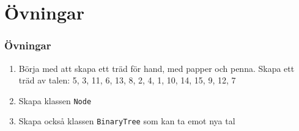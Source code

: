\documentclass[aspectratio=169]{beamer}
\begin{document}
\section{Övningar}

\begin{frame}
	\frametitle{Övningar}
	
	\begin{enumerate}
		\item Börja med att skapa ett träd för hand, med papper och penna. Skapa ett träd av talen: 5, 3, 11, 6, 13, 8, 2, 4, 1, 10, 14, 15, 9, 12, 7
		\item Skapa klassen \texttt{Node}
		\item Skapa också klassen \texttt{BinaryTree} som kan ta emot nya tal
	\end{enumerate}
	
\end{frame}
\end{document}
